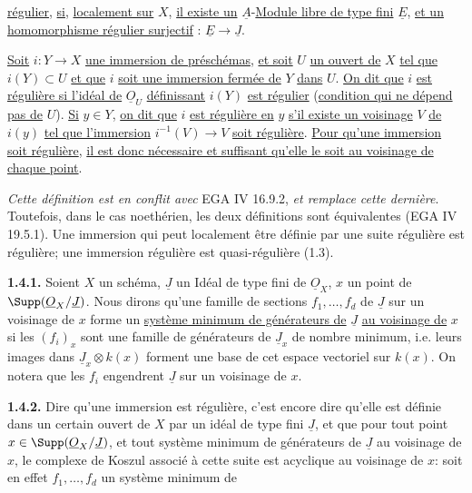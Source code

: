 
\uline{régulier}, \uline{si}, \uline{localement sur} $X$, \uline{il existe un} $\underline{A}$-\uline{Module libre de type fini} $\underline{E}$, \uline{et un homomorphisme régulier surjectif} : $\underline{E}\longrightarrow \underline{J}$.

\uline{Soit} $i:Y\longrightarrow X$ \uline{une immersion de préschémas}, \uline{et soit} $U$ \uline{un ouvert de} $X$ \uline{tel que} $i(Y)\subset U$ \uline{et que} $i$ \uline{soit une immersion fermée de} $Y$ \uline{dans} $U$. \uline{On dit que} $i$ \uline{est régulière si l'idéal de} $\underline{O}_U$ \uline{définissant} $i(Y)$ \uline{est régulier} (\uline{condition qui ne dépend pas de} $U$). \uline{Si} $y\in Y$, \uline{on dit que} $i$ \uline{est régulière en} $y$ \uline{s'il existe un voisinage} $V$ \uline{de} $i(y)$ \uline{tel que l'immersion} $i^{-1}(V)\longrightarrow V$ \uline{soit régulière}. \uline{Pour qu'une immersion soit régulière}, \uline{il est donc nécessaire et suffisant qu'elle le soit au voisinage de chaque point}.

\emph{Cette définition est en conflit avec} EGA IV 16.9.2, \emph{et remplace cette dernière}. Toutefois, dans le cas noethérien, les deux définitions sont équivalentes (EGA IV 19.5.1). Une immersion qui peut localement être définie par une suite régulière est régulière; une immersion régulière est quasi-régulière (1.3).

\textbf{1.4.1.} Soient $X$ un schéma, $\underline{J}$ un Idéal de type fini de $\underline{O}_X$, $x$ un point de $\Supp(\underline{O}_X/\underline{J})$. Nous dirons qu'une famille de sections $f_1,\ldots,f_d$ de $\underline{J}$ sur un voisinage de $x$ forme un \uline{système minimum de générateurs de} $\underline{J}$ \uline{au voisinage de} $x$ si les $(f_i)_x$ sont une famille de générateurs de $\underline{J}_x$ de nombre minimum, i.e. leurs images dans $\underline{J}_x\otimes k(x)$ forment une base de cet espace vectoriel sur $k(x)$. On notera que les $f_i$ engendrent $\underline{J}$ sur un voisinage de $x$.

\textbf{1.4.2.} Dire qu'une immersion est régulière, c'est encore dire qu'elle est définie dans un certain ouvert de $X$ par un idéal de type fini $\underline{J}$, et que pour tout point $x\in\Supp(\underline{O}_X/\underline{J})$, et tout système minimum de générateurs de $\underline{J}$ au voisinage de $x$, le complexe de Koszul associé à cette suite est acyclique au voisinage de $x$: soit en effet $f_1,\ldots,f_d$ un système minimum de
